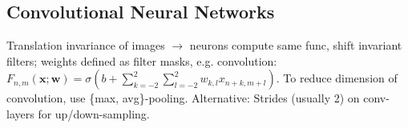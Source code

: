 \subsection*{Convolutional Neural Networks}
Translation invariance of images $\rightarrow$ neurons compute same func, shift invariant filters; weights defined as filter masks, e.g. convolution: $F_{n,m}(\mathbf{x};\mathbf{w}) = \sigma(b + \sum_{k=-2}^2\sum_{l=-2}^{2}{w_{k,l}x_{n+k,m+l}})$. To reduce dimension of convolution, use \{max, avg\}-pooling. Alternative: Strides (usually 2) on conv-layers for up/down-sampling.
